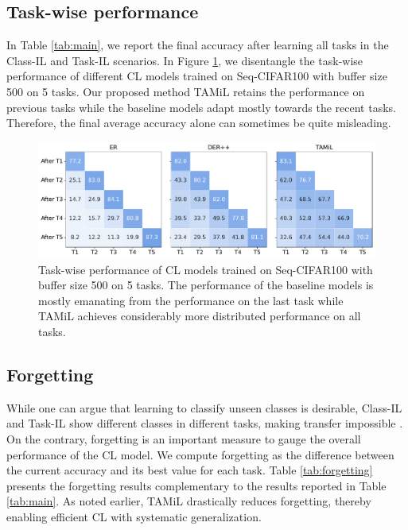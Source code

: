 \documentclass{article} %
\begin{document}
\subsection{Task-wise performance}
In Table \ref{tab:main}, we report the final accuracy after learning all tasks in the Class-IL and Task-IL scenarios. In Figure \ref{fig:taskwise}, we disentangle the task-wise performance of different CL models trained on Seq-CIFAR100 with buffer size 500 on 5 tasks. Our proposed method TAMiL retains the performance on previous tasks while the baseline models adapt mostly towards the recent tasks. Therefore, the final average accuracy alone can sometimes be quite misleading. 

\begin{figure}[t]
  \centering
  \includegraphics[width=\linewidth]{images/task_all_cif100.pdf}
  \caption{Task-wise performance of CL models trained on Seq-CIFAR100 with buffer size 500 on 5 tasks. The performance of the baseline models is mostly emanating from the performance on the last task while TAMiL achieves considerably more distributed performance on all tasks.   }
  \label{fig:taskwise}
\end{figure}

\subsection{Forgetting} \label{forgetting}
While one can argue that learning to classify unseen classes is desirable,  Class-IL and Task-IL show different classes in different tasks, making transfer impossible \citep{buzzega2020dark}. On the contrary, forgetting is an important measure to gauge the overall performance of the CL model. We compute forgetting as the difference between the current accuracy and its best value for each task. Table \ref{tab:forgetting} presents the forgetting results complementary to the results reported in Table \ref{tab:main}. As noted earlier, TAMiL drastically reduces forgetting, thereby enabling efficient CL with systematic generalization. 
\end{document}
